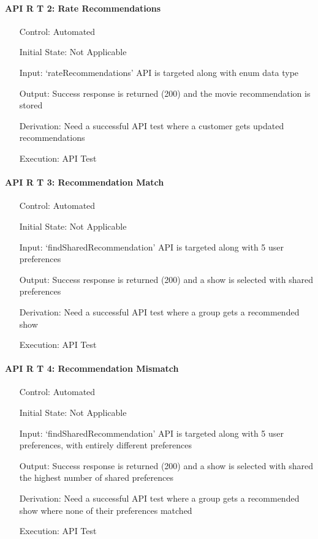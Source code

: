 \documentclass[12pt, titlepage]{article}
\begin{document}
\paragraph*{API R T 2: Rate Recommendations}
\begin{itemize}
	\item[Control:] Automated
	\item[Initial State:] Not Applicable
	\item[Input:] `rateRecommendations' API is targeted along with enum data type
	\item[Output:] Success response is returned (200) and the movie recommendation is stored
	\item[Derivation:] Need a successful API test where a customer gets updated recommendations
	\item[Execution:] API Test
\end{itemize}

\paragraph*{API R T 3: Recommendation Match}
\begin{itemize}
	\item[Control:] Automated
	\item[Initial State:] Not Applicable
	\item[Input:] `findSharedRecommendation' API is targeted along with 5 user preferences
	\item[Output:] Success response is returned (200) and a show is selected with shared preferences
	\item[Derivation:] Need a successful API test where a group gets a recommended show
	\item[Execution:] API Test
\end{itemize}

\paragraph*{API R T 4: Recommendation Mismatch}
\begin{itemize}
	\item[Control:] Automated
	\item[Initial State:] Not Applicable
	\item[Input:] `findSharedRecommendation' API is targeted along with 5 user preferences, with entirely different preferences
	\item[Output:] Success response is returned (200) and a show is selected with shared the highest number of shared preferences
	\item[Derivation:] Need a successful API test where a group gets a recommended show where none of their preferences matched
	\item[Execution:] API Test
\end{itemize}
\end{document}
